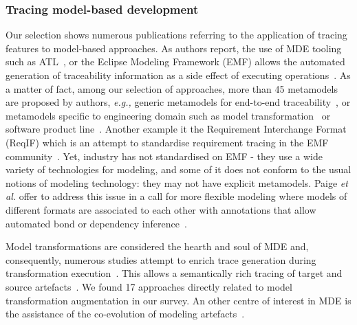 \subsubsection{Tracing model-based development}\label{sec:MDEtracing}%
Our selection shows numerous publications referring to the application of tracing features to model-based approaches. As authors report, the use of MDE tooling such as ATL~\cite{Santiago_2013,Jim_nez_2013}, or the Eclipse Modeling Framework (EMF) allows the automated generation of traceability information as a side effect of executing operations~\cite{galvao2007-survey-traceability-in-MDE,winkler2010-survey-traceability-and-MDE}. 
As a matter of fact, among our selection of approaches, more than 45 metamodels are proposed by authors, \textit{e.g.,} generic metamodels for end-to-end traceability~\cite{heisig2019-generic-traceability-metamodel-end-to-end-capra,Haidrar_2016}, or metamodels specific to engineering domain such as model transformation~\cite{Jim_nez_2013,anquetil2010-model-driven-tracea-for-SPL,vara2014-traceability-in-MDD-MTransfo} or software product line~\cite{Jim_nez_2013,vara2014-traceability-in-MDD-MTransfo}. 
Another example it the Requirement Interchange Format (ReqIF) which is an attempt to standardise requirement tracing in the EMF community~\cite{Graf_2012}.
Yet, industry has not standardised on EMF - they use a wide variety of technologies for modeling, and some of it does not conform to the usual notions of modeling technology: they may not have explicit metamodels.
Paige \textit{et al.} offer to address this issue in a call for more flexible modeling where models of different formats are associated to each other with annotations that allow automated bond or dependency inference~\cite{seiler2019-comparing-trac-through-IR-Commits-Logs,paige2017-changing-mde}.

Model transformations are considered the hearth and soul of MDE and, consequently, numerous studies attempt to enrich trace generation during transformation execution~\cite{vara2014-traceability-in-MDD-MTransfo,Saada_2013,la_Fosse_2018}. This allows a semantically rich tracing of target and source artefacts~\cite{paige2011-traces-in-moel-driven-engineering}. We found 17 approaches directly related to model transformation augmentation in our survey. An other centre of interest in MDE is the assistance of the co-evolution of modeling artefacts~\cite{Szabo_2013}.  


